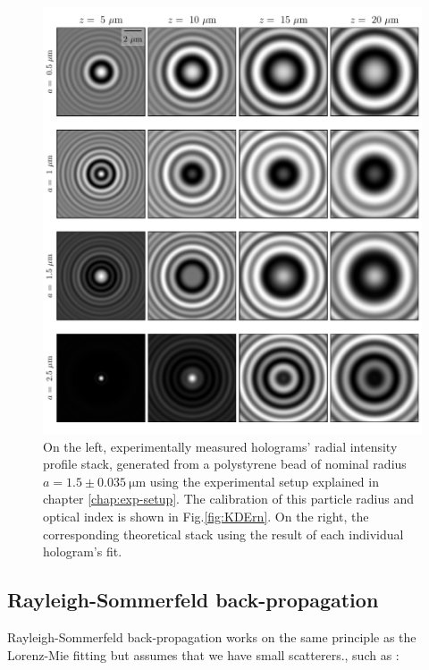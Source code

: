 \begin{figure}
	\centering
	\includegraphics{02_body/chapter2/images/holo_size_exemple/holos_fix_n.pdf}
	\caption{On the left, experimentally measured  holograms' radial intensity profile stack, generated from a polystyrene bead of nominal radius $a = 1.5 \pm 0.035 ~ \mathrm{\mu m} $ using the experimental setup explained in chapter \ref{chap:exp-setup}. The calibration of this particle radius and optical index is shown in Fig.\ref{fig:KDErn}. On the right, the corresponding theoretical stack using the result of each individual hologram's fit.}
	\label{fig.holo_fix_n}
\end{figure}

\clearpage
\newpage

\subsection{ Rayleigh-Sommerfeld back-propagation}





Rayleigh-Sommerfeld back-propagation \cite{wilson_3d_2012} works on the same principle as the Lorenz-Mie fitting but assumes that we have small scatterers., such as :

